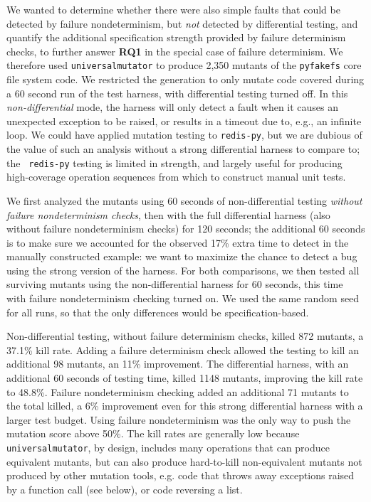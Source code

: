 We wanted to determine whether there were also simple faults that
could be detected by failure nondeterminism, but \emph{not} detected
by differential testing, and quantify the additional specification
strength provided by failure determinism checks, to further answer
{\bf RQ1} in the special case of failure determinism.  We therefore used
{\tt universalmutator} \cite{RegExpMut} to produce 2,350 mutants of
the {\tt pyfakefs} core file system code.   We restricted the generation
to only mutate code covered during a 60 second run of the test
harness, with differential testing turned off.  In this
\emph{non-differential} mode, the harness will only detect a fault when it
causes an unexpected exception to be raised, or results in a timeout
due to, e.g., an infinite loop.  We could have applied mutation
testing to {\tt redis-py}, but we are dubious of the value of such an
analysis without a strong differential harness to compare to; the {\tt
  redis-py} testing is limited in strength, and largely useful for
producing high-coverage operation sequences from which to construct
manual unit tests.

We first analyzed the mutants using 60 seconds of non-differential
testing \emph{without failure nondeterminism checks}, then with the
full differential harness (also without failure nondeterminism checks)
for 120 seconds; the additional 60 seconds is to make sure we accounted for the observed 17\%
extra time to detect in the manually constructed example: we want to
maximize the chance to detect a bug using the strong version of the harness.   For both comparisons, we then tested
all surviving mutants using the non-differential harness for 60
seconds, this time with failure nondeterminism checking turned on.
We used the same random seed for
all runs, so that the only differences would be specification-based.

Non-differential testing, without failure determinism checks, killed
872 mutants, a 37.1\% kill rate.  Adding a failure determinism check
allowed the testing to kill an additional 98 mutants, an 11\% improvement.
The differential harness, with an additional 60 seconds of testing
time, killed 1148 mutants, improving the kill rate to 48.8\%.  Failure
nondeterminism checking added an
additional 71 mutants to the total killed, a 6\% improvement even for
this strong differential harness with a larger test budget.  Using
failure nondeterminism was the only way to push the mutation score
above 50\%.  The kill rates are generally low
because {\tt universalmutator}, by design, includes many operations
that can produce equivalent mutants, but can also produce hard-to-kill
non-equivalent mutants not produced by other mutation tools, e.g. code
that throws away exceptions raised by a function call (see below), or code
reversing a list.

